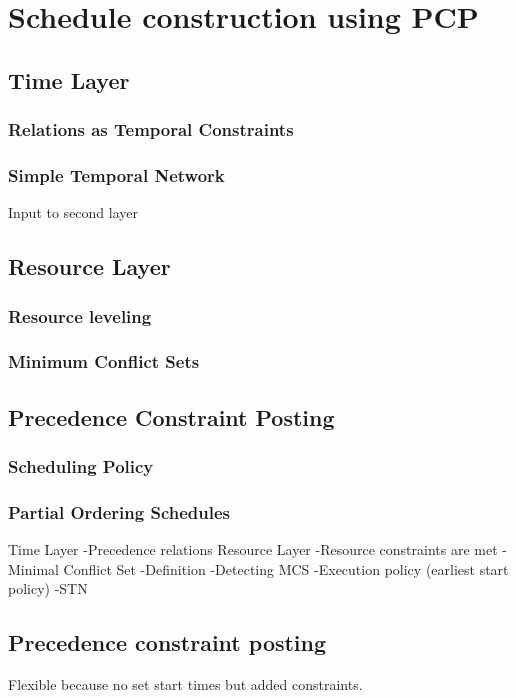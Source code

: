 \documentclass{article}
\begin{document}
\newpage

\section{Schedule construction using PCP}
\subsection{Time Layer}
\subsubsection{Relations as Temporal Constraints}
\subsubsection{Simple Temporal Network}
Input to second layer

\subsection{Resource Layer}
\subsubsection{Resource leveling}
\subsubsection{Minimum Conflict Sets}

\subsection{Precedence Constraint Posting}
\subsubsection{Scheduling Policy}
\subsubsection{Partial Ordering Schedules}

Time Layer
-Precedence relations
Resource Layer
-Resource constraints are met
-Minimal Conflict Set
	-Definition
-Detecting MCS
	-Execution policy (earliest start policy)
	-STN

\subsection{Precedence constraint posting}
Flexible because no set start times but added constraints.
\end{document}
